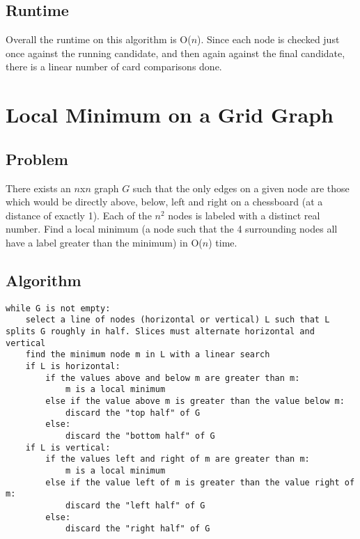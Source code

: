 \documentclass[titlepage]{article}
\numberwithin{equation}{subsection}
\begin{document}
\subsection{Runtime}
Overall the runtime on this algorithm is O($n$). Since each node is checked just once against the running
candidate, and then again against the final candidate, there is a linear number of card comparisons
done.
\section{Local Minimum on a Grid Graph}
\subsection{Problem}
There exists an $n$x$n$ graph $G$ such that the only edges on a given node are those
which would be directly above, below, left and right on a chessboard (at a distance of exactly 1).
Each of the $n^2$ nodes is labeled with a distinct real number. Find a local minimum (a node such that
the 4 surrounding nodes all have a label greater than the minimum) in O($n$) time.
\subsection{Algorithm}
\begin{minipage}{\linewidth}
\begin{lstlisting}
while G is not empty:
    select a line of nodes (horizontal or vertical) L such that L splits G roughly in half. Slices must alternate horizontal and vertical
    find the minimum node m in L with a linear search
    if L is horizontal:
        if the values above and below m are greater than m:
            m is a local minimum
        else if the value above m is greater than the value below m:
            discard the "top half" of G
        else:
            discard the "bottom half" of G
    if L is vertical:
        if the values left and right of m are greater than m:
            m is a local minimum
        else if the value left of m is greater than the value right of m:
            discard the "left half" of G
        else:
            discard the "right half" of G
\end{lstlisting}
\end{minipage}
\end{document}
